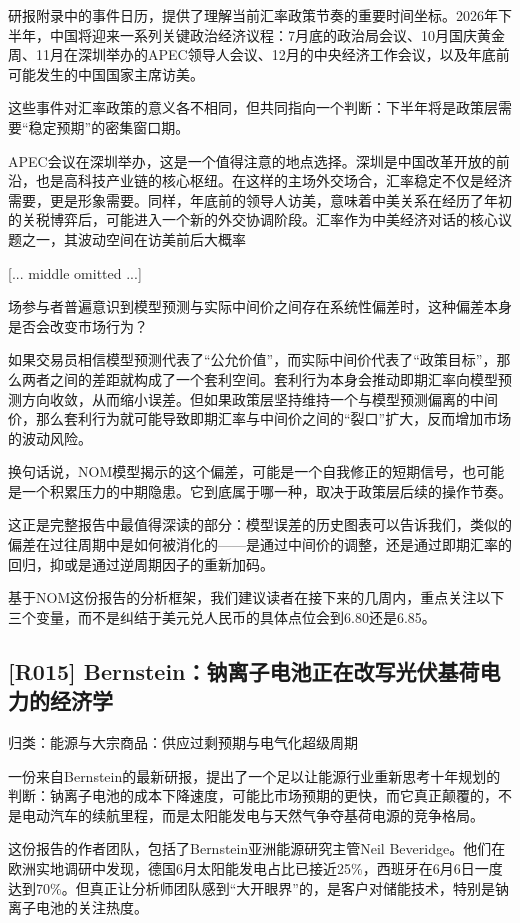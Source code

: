 \documentclass[11pt]{ctexart}
\begin{document}
研报附录中的事件日历，提供了理解当前汇率政策节奏的重要时间坐标。2026年下半年，中国将迎来一系列关键政治经济议程：7月底的政治局会议、10月国庆黄金周、11月在深圳举办的APEC领导人会议、12月的中央经济工作会议，以及年底前可能发生的中国国家主席访美。

这些事件对汇率政策的意义各不相同，但共同指向一个判断：下半年将是政策层需要“稳定预期”的密集窗口期。

APEC会议在深圳举办，这是一个值得注意的地点选择。深圳是中国改革开放的前沿，也是高科技产业链的核心枢纽。在这样的主场外交场合，汇率稳定不仅是经济需要，更是形象需要。同样，年底前的领导人访美，意味着中美关系在经历了年初的关税博弈后，可能进入一个新的外交协调阶段。汇率作为中美经济对话的核心议题之一，其波动空间在访美前后大概率

[... middle omitted ...]

场参与者普遍意识到模型预测与实际中间价之间存在系统性偏差时，这种偏差本身是否会改变市场行为？

如果交易员相信模型预测代表了“公允价值”，而实际中间价代表了“政策目标”，那么两者之间的差距就构成了一个套利空间。套利行为本身会推动即期汇率向模型预测方向收敛，从而缩小误差。但如果政策层坚持维持一个与模型预测偏离的中间价，那么套利行为就可能导致即期汇率与中间价之间的“裂口”扩大，反而增加市场的波动风险。

换句话说，NOM模型揭示的这个偏差，可能是一个自我修正的短期信号，也可能是一个积累压力的中期隐患。它到底属于哪一种，取决于政策层后续的操作节奏。

这正是完整报告中最值得深读的部分：模型误差的历史图表可以告诉我们，类似的偏差在过往周期中是如何被消化的——是通过中间价的调整，还是通过即期汇率的回归，抑或是通过逆周期因子的重新加码。

基于NOM这份报告的分析框架，我们建议读者在接下来的几周内，重点关注以下三个变量，而不是纠结于美元兑人民币的具体点位会到6.80还是6.85。

\subsection{[R015] Bernstein：钠离子电池正在改写光伏基荷电力的经济学}
{\small\color{refgray}归类：能源与大宗商品：供应过剩预期与电气化超级周期}

一份来自Bernstein的最新研报，提出了一个足以让能源行业重新思考十年规划的判断：钠离子电池的成本下降速度，可能比市场预期的更快，而它真正颠覆的，不是电动汽车的续航里程，而是太阳能发电与天然气争夺基荷电源的竞争格局。

这份报告的作者团队，包括了Bernstein亚洲能源研究主管Neil Beveridge。他们在欧洲实地调研中发现，德国6月太阳能发电占比已接近25\%，西班牙在6月6日一度达到70\%。但真正让分析师团队感到“大开眼界”的，是客户对储能技术，特别是钠离子电池的关注热度。
\end{document}
